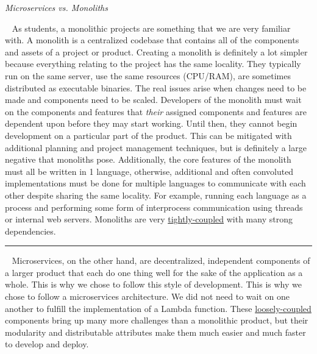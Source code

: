 \documentclass[10pt, a4paper]{article}
\begin{document}
\vspace{2mm}
\begin{tcolorbox}
	\emph{Microservices vs. Monoliths} \\
\par ~ As students, a monolithic projects are something that we are very familiar with. A monolith is a centralized codebase that contains all of the components and assets of a project or product. Creating a monolith is definitely a lot simpler because everything relating to the project has the same locality. They typically run on the same server, use the same resources (CPU/RAM), are sometimes distributed as executable binaries. The real issues arise when changes need to be made and components need to be scaled. Developers of the monolith must wait on the components and features that \emph{their} assigned components and features are dependent upon before they may start working. Until then, they cannot begin development on a particular part of the product. This can be mitigated with additional planning and project management techniques, but is definitely a large negative that monoliths pose. Additionally, the core features of the monolith must all be written in 1 language, otherwise, additional and often convoluted implementations must be done for multiple languages to communicate with each other despite sharing the same locality. For example, running each language as a process and performing some form of interprocess communication using threads or internal web servers. Monoliths are very \underline{tightly-coupled} with many strong dependencies.

\vspace{2mm}
\hrule
\vspace{2mm}

\par ~ Microservices, on the other hand, are decentralized, independent components of a larger product that each do one thing well for the sake of the application as a whole. This is why we chose to follow this style of development. This is why we chose to follow a microservices architecture. We did not need to wait on one another to fulfill the implementation of a Lambda function. These \underline{loosely-coupled} components bring up many more challenges than a monolithic product, but their modularity and distributable attributes make them much easier and much faster to develop and deploy.
\end{tcolorbox}
	
\end{document}
